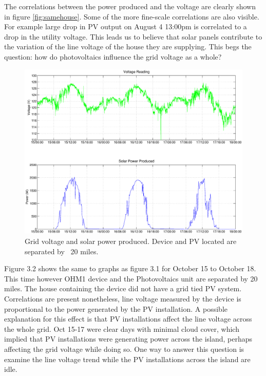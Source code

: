The correlations between the power produced and the voltage are clearly shown in figure  \ref{fig:samehouse}. Some of the more fine-scale correlations are also visible. 
For example large drop in PV output on August 4 13:00pm is correlated to a drop in the utility voltage. This leads us to believe that solar panels contribute to the
variation of the line voltage of the house they are supplying. This begs the question: how do photovoltaics influence the grid voltage as a whole?

\begin{figure}[h!]
\centering
\includegraphics[width=\textwidth]{img/SunnyWeather.eps}
\caption{Grid voltage and solar power produced. Device and PV located are separated by ~20 miles.}
\label{fig:diffhouse}
\end{figure} 

Figure 3.2 shows the same to graphs as figure 3.1 for October 15 to October 18. This time however OHM1 device and the Photovoltaics unit are separated by 20 miles. The house
containing the device did not have a grid tied PV system. Correlations are present nonetheless, line voltage measured by the device is proportional to the power generated by the PV installation.
A possible explanation for this effect is that PV installations affect the line voltage across the whole grid. Oct 15-17 were clear days with minimal cloud cover, which implied that PV
installations were generating power across the island, perhaps affecting the grid voltage while doing so. One way to answer this question is examine the line voltage trend while the PV installations
across the island are idle. 

